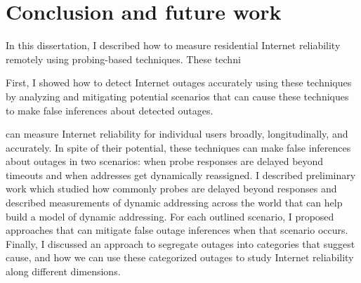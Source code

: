 
\section{Conclusion and future work}

In this dissertation, I described how to measure residential Internet
reliability remotely using probing-based techniques. These techni

First, I showed
how to detect Internet outages accurately using these techniques by
analyzing and mitigating potential scenarios that can cause these
techniques to make false inferences about detected outages. 

 can measure Internet
reliability for individual users broadly, longitudinally, and
accurately. In spite of their potential, these techniques can make
false inferences about outages in two scenarios: when probe
responses are delayed beyond timeouts and when addresses get dynamically
reassigned. I described preliminary work which studied how commonly
probes are delayed beyond responses and described measurements of
dynamic addressing across the world that can help build a model of
dynamic addressing. For each outlined scenario, I proposed approaches
that can mitigate false outage inferences when that scenario
occurs. Finally, I discussed an approach to segregate outages into
categories that suggest cause, and how we can use these categorized
outages to study Internet reliability along different dimensions.
